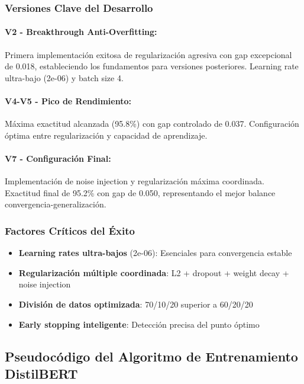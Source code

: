 \subsubsection{Versiones Clave del Desarrollo}

\paragraph{V2 - Breakthrough Anti-Overfitting:}
Primera implementación exitosa de regularización agresiva con gap excepcional de 0.018, estableciendo los fundamentos para versiones posteriores. Learning rate ultra-bajo (2e-06) y batch size 4.

\paragraph{V4-V5 - Pico de Rendimiento:}
Máxima exactitud alcanzada (95.8\%) con gap controlado de 0.037. Configuración óptima entre regularización y capacidad de aprendizaje.

\paragraph{V7 - Configuración Final:}
Implementación de noise injection y regularización máxima coordinada. Exactitud final de 95.2\% con gap de 0.050, representando el mejor balance convergencia-generalización.

\subsubsection{Factores Críticos del Éxito}

\begin{itemize}
    \item \textbf{Learning rates ultra-bajos} (2e-06): Esenciales para convergencia estable
    \item \textbf{Regularización múltiple coordinada}: L2 + dropout + weight decay + noise injection
    \item \textbf{División de datos optimizada}: 70/10/20 superior a 60/20/20
    \item \textbf{Early stopping inteligente}: Detección precisa del punto óptimo
\end{itemize}

\subsection{Pseudocódigo del Algoritmo de Entrenamiento DistilBERT}
\label{subsec:pseudocodigo_distilbert}

